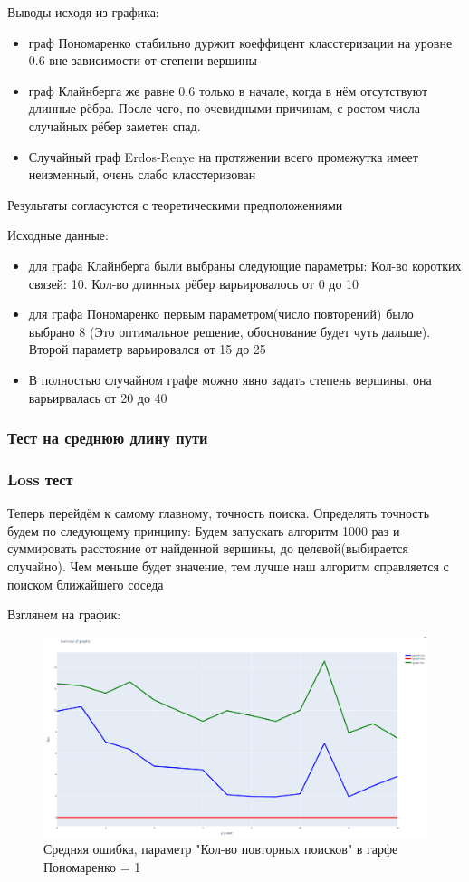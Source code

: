 Выводы исходя из графика:

\begin{itemize}
    \item граф Пономаренко стабильно дуржит коеффицент класстеризации на уровне 0.6 вне
    зависимости от степени вершины 
    \item граф Клайнберга же равне 0.6 только в начале, когда в нём отсутствуют длинные рёбра.
    После чего, по очевидными причинам, с ростом числа случайных рёбер заметен спад.
    \item Случайный граф Erdos-Renye на протяжении всего промежутка имеет неизменный, очень
    слабо класстеризован
\end{itemize}
Результаты согласуются с теоретическими предположениями

Исходные данные:
\begin{itemize}
    \item для графа Клайнберга были выбраны следующие параметры: Кол-во коротких связей: 10. Кол-во длинных
рёбер варьировалось от 0 до 10
    \item для графа Пономаренко первым параметром(число повторений) было выбрано 8 (Это оптимальное решение,
обоснование будет чуть дальше). Второй параметр варьировался от 15 до 25
    \item В полностью случайном графе можно явно задать степень вершины, она варьирвалась от 20 до 40
\end{itemize}


\subsubsection{Тест на среднюю длину пути}

\subsubsection{Loss тест}

Теперь перейдём к самому главному, точность поиска.
Определять точность будем по следующему принципу: Будем запускать алгоритм 1000 раз и 
суммировать расстояние от найденной вершины, до целевой(выбирается случайно).
Чем меньше будет значение, тем лучше наш алгоритм справляется с поиском ближайшего соседа

Взглянем на график:
\begin{figure}[H]
    \centering
    \includegraphics[scale=0.25]{./pictures/sum_loss_imp1.png}
    \caption{Средняя ошибка, параметр "Кол-во повторных поисков" в гарфе Пономаренко = 1 } \label{sum_loss}
\end{figure}


